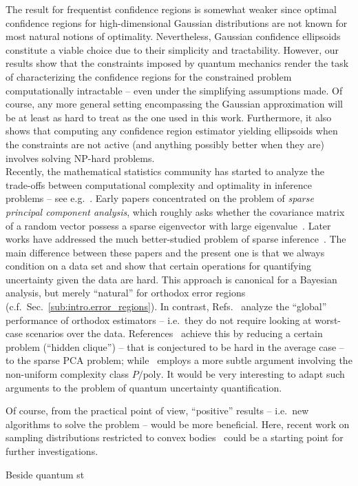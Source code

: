 The result for frequentist confidence regions is somewhat weaker since optimal confidence regions for high-dimensional Gaussian distributions are not known for most natural notions of optimality.
Nevertheless, Gaussian confidence ellipsoids constitute a viable choice due to their simplicity and tractability.
However, our results show that the constraints imposed by quantum mechanics render the task of characterizing the confidence regions for the constrained problem computationally intractable -- even under the simplifying assumptions made.
Of course, any more general setting encompassing the Gaussian approximation will be at least as hard to treat as the one used in this work.
Furthermore, it also shows that computing any confidence region estimator yielding ellipsoids when the constraints are not active (and anything possibly better when they are) involves solving NP-hard problems.\\


Recently, the mathematical statistics community has started to analyze the trade-offs between computational complexity and optimality in inference problems -- see e.g.\
\cite{Berthet_2013_Complexity,Berthet_2013_Computational,Zhang_2014_Lower}.
Early papers concentrated on the problem of \emph{sparse principal component analysis}, which roughly asks whether the covariance matrix of a random vector possess a sparse eigenvector with large eigenvalue~\cite{Berthet_2013_Complexity,Berthet_2013_Computational,Zhang_2014_Lower}.
Later works have addressed the much better-studied problem of sparse inference~\cite{Zhang_2014_Lower}.
The main difference between these papers and the present one is that we always condition on a data set and show that certain operations for quantifying uncertainty given the data are hard.
This approach is canonical for a Bayesian analysis, but merely ``natural'' for orthodox error regions (c.f.~Sec.~\ref{sub:intro.error_regions}).
In contrast, Refs.~\cite{Berthet_2013_Complexity,Berthet_2013_Computational,Zhang_2014_Lower} analyze the ``global'' performance of orthodox estimators -- i.e.\ they do not require looking at worst-case scenarios over the data.
References~\cite{Berthet_2013_Complexity,Berthet_2013_Computational,Zhang_2014_Lower} achieve this by reducing a certain problem (``hidden clique'') -- that is conjectured to be hard in the average case -- to the sparse PCA problem; while~\cite{Zhang_2014_Lower} employs a more subtle argument involving the non-uniform complexity class $P/\mathrm{poly}$.
It would be very interesting to adapt such arguments to the problem of quantum uncertainty quantification.


Of course, from the practical point of view, ``positive'' results -- i.e.\ new algorithms to solve the problem -- would be more beneficial.
Here, recent work on sampling distributions restricted to convex bodies~\cite{Cousins_2013_Cubic,Cousins_2015_Bypassing} could be a starting point for further investigations.

Beside quantum st
